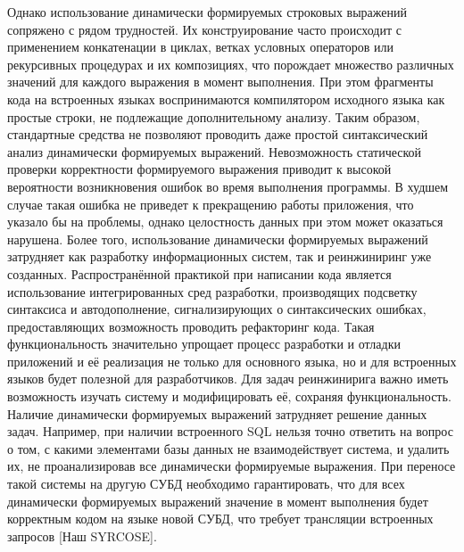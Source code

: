 Однако использование динамически формируемых строковых выражений сопряжено с рядом трудностей. Их конструирование часто происходит с применением конкатенации в циклах, ветках условных операторов или рекурсивных процедурах и их композициях, что порождает множество различных значений для каждого выражения в момент выполнения. При этом фрагменты кода на встроенных языках воспринимаются компилятором исходного языка как простые строки, не подлежащие дополнительному анализу. Таким образом, стандартные средства не позволяют проводить даже простой синтаксический анализ динамически формируемых выражений. Невозможность статической проверки корректности формируемого выражения приводит к высокой вероятности возникновения ошибок во время выполнения программы. В худшем случае такая ошибка не приведет к прекращению работы приложения, что указало бы на проблемы, однако целостность данных при этом может оказаться нарушена. Более того, использование динамически формируемых выражений затрудняет как разработку информационных систем, так и реинжиниринг уже созданных. Распространённой практикой при написании кода является использование интегрированных сред разработки, производящих подсветку синтаксиса и автодополнение, сигнализирующих о синтаксических ошибках, предоставляющих возможность проводить рефакторинг кода. Такая функциональность значительно упрощает процесс разработки и отладки приложений и её реализация не только для основного языка, но и для встроенных языков будет полезной для разработчиков. Для задач реинжинирига важно иметь возможность изучать систему и модифицировать её, сохраняя функциональность. Наличие динамически формируемых выражений затрудняет решение данных задач. Например, при наличии встроенного SQL нельзя точно ответить на вопрос о том, с какими элементами базы данных не взаимодействует система, и  удалить их, не проанализировав все динамически формируемые выражения. При переносе такой системы на другую СУБД необходимо гарантировать, что для всех динамически формируемых выражений значение в момент выполнения будет корректным кодом на языке новой СУБД, что требует трансляции встроенных запросов [Наш SYRCOSE]. 

